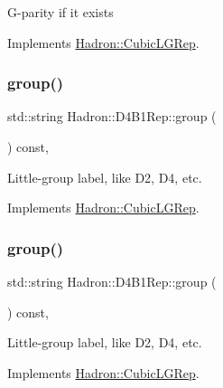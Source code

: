 G-\/parity if it exists 

Implements \mbox{\hyperlink{structHadron_1_1CubicLGRep_ace26f7b2d55e3a668a14cb9026da5231}{Hadron\+::\+Cubic\+L\+G\+Rep}}.

\mbox{\label{structHadron_1_1D4B1Rep_a030bc1e51b0cc790000a6ce72d132d06}} 
\subsubsection{\texorpdfstring{group()}{group()}\hspace{0.1cm}{\footnotesize\ttfamily [1/3]}}
{\footnotesize\ttfamily std\+::string Hadron\+::\+D4\+B1\+Rep\+::group (\begin{DoxyParamCaption}{ }\end{DoxyParamCaption}) const\hspace{0.3cm}{\ttfamily [inline]}, {\ttfamily [virtual]}}

Little-\/group label, like D2, D4, etc. 

Implements \mbox{\hyperlink{structHadron_1_1CubicLGRep_a9bdb14b519a611d21379ed96a3a9eb41}{Hadron\+::\+Cubic\+L\+G\+Rep}}.

\mbox{\label{structHadron_1_1D4B1Rep_a030bc1e51b0cc790000a6ce72d132d06}} 
\subsubsection{\texorpdfstring{group()}{group()}\hspace{0.1cm}{\footnotesize\ttfamily [2/3]}}
{\footnotesize\ttfamily std\+::string Hadron\+::\+D4\+B1\+Rep\+::group (\begin{DoxyParamCaption}{ }\end{DoxyParamCaption}) const\hspace{0.3cm}{\ttfamily [inline]}, {\ttfamily [virtual]}}

Little-\/group label, like D2, D4, etc. 

Implements \mbox{\hyperlink{structHadron_1_1CubicLGRep_a9bdb14b519a611d21379ed96a3a9eb41}{Hadron\+::\+Cubic\+L\+G\+Rep}}.

\mbox{\label{structHadron_1_1D4B1Rep_a030bc1e51b0cc790000a6ce72d132d06}} 
